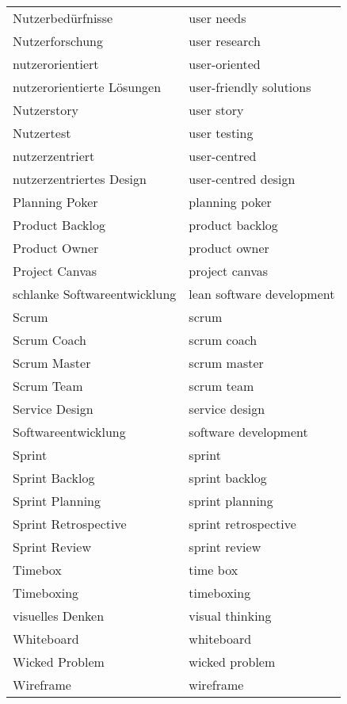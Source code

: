 \begin{spacing}{.5}
\begin{longtable}{ p{} p{}}
    Nutzerbedürfnisse & user needs \\
    Nutzerforschung & user research \\
    nutzerorientiert & user-oriented \\
    nutzerorientierte Lösungen & user-friendly solutions \\
    Nutzerstory & user story \\
    Nutzertest & user testing \\
    nutzerzentriert & user-centred \\
    nutzerzentriertes Design & user-centred design \\
    Planning Poker & planning poker \\
    Product Backlog & product backlog \\
    Product Owner & product owner \\
    Project Canvas & project canvas \\
    schlanke Softwareentwicklung & lean software development \\
    Scrum & scrum \\
    Scrum Coach & scrum coach \\
    Scrum Master & scrum master \\
    Scrum Team & scrum team \\
    Service Design & service design \\
    Softwareentwicklung & software development \\
    Sprint & sprint \\
    Sprint Backlog & sprint backlog \\
    Sprint Planning & sprint planning \\
    Sprint Retrospective & sprint retrospective \\
    Sprint Review & sprint review \\
    Timebox & time box \\
    Timeboxing & timeboxing \\
    visuelles Denken & visual thinking \\
    Whiteboard & whiteboard \\
    Wicked Problem & wicked problem \\
    Wireframe & wireframe \\
\end{longtable}
\end{spacing}
\endgroup


\newpage

